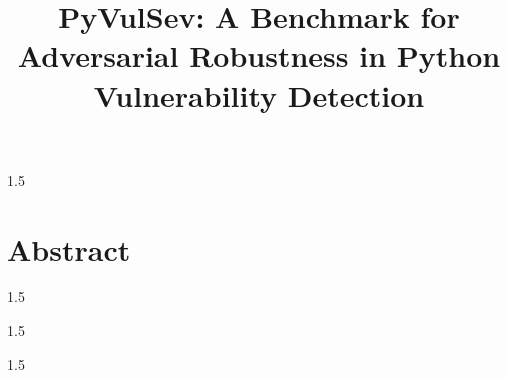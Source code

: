 \documentclass[12pt,oneside,a4paper]{book} %
\title{PyVulSev: A Benchmark for Adversarial Robustness in Python Vulnerability Detection}
\begin{document}
	\NoBgThispage%
	\maketitle
	\newpage
	\ifDrf
	\else
	\begin{spacing}{1.5}
		
		
		\newpage
		
		
		\newpage
		
		
		\newpage
		
		\chapter*{Abstract}
		

		\newpage
		
		
	\end{spacing}
	\newpage
	\pagestyle{fplain}
	\begin{spacing}{1.5}
		\tableofcontents	
	\end{spacing}
	\newpage
	\begin{spacing}{1.5}
		\cleardoublepage
		\listoffigures	
	\end{spacing}
	\newpage
	\begin{spacing}{1.5}
		\cleardoublepage
		\listoftables	
	\end{spacing}
	
	\printglossary[type=\acronymtype, title= Abbreviations, toctitle=Abbreviations]
	
\end{document}
